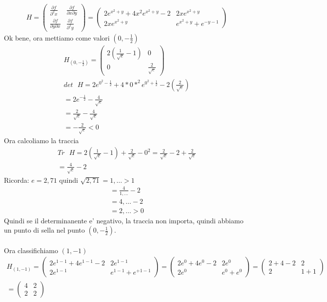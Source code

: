 \documentclass{article}
\begin{document}
\begin{align*}
    H=\begin{pmatrix}
        \frac{\partial f}{\partial^2 x} & \frac{\partial f}{\partial x \partial y} \\
        \frac{\partial f}{\partial y \partial x} & \frac{\partial f}{\partial^2 y}
    \end{pmatrix}
    = \begin{pmatrix}
        2e^{x^2+y}+4x^2e^{x^2+y}-2 & 2xe^{x^2+y} \\
        2xe^{x^2+y} & e^{x^2+y} + e^{-y-1}
    \end{pmatrix}
\end{align*}
Ok bene, ora mettiamo come valori $(0,-\frac{1}{2})$
\begin{align*}
    H_{(0,-\frac{1}{2})}=\begin{pmatrix}
        2(\frac{1}{\sqrt{e}}-1) & 0 \\
        0 & \frac{2}{\sqrt{e}}
    \end{pmatrix}\\
     \text{$det$ $H$}=2e^{0^2-\frac{1}{2}}+4*0*^2e^{0^2+\frac{1}{2}}-2(\frac{2}{\sqrt{e}}) \\
     = 2e^{-\frac{1}{2}}-\frac{4}{\sqrt{e}} \\
     = \frac{2}{\sqrt{e}}-\frac{4}{\sqrt{e}} \\
     = -\frac{2}{\sqrt{e}} < 0
\end{align*}
Ora calcoliamo la traccia
\begin{align*}
     \text{$Tr$ $H$}= 2(\frac{1}{\sqrt{e}}-1) + \frac{2}{\sqrt{e}} - 0^2=  \frac{2}{\sqrt{e}}-2+ \frac{2}{\sqrt{e}}\\     
     = \frac{4}{\sqrt{e}}-2
\end{align*}
Ricorda: $e=2,71$ quindi $\sqrt{2,71}=1,\dots > 1$ 
\begin{align*}
    = \frac{4}{1,\dots}-2 \\
    = 4,\dots -2 \\
    = 2,\dots >0
\end{align*}
Quindi se il determinanente e' negativo, la traccia non importa, quindi abbiamo un punto di sella nel punto $(0,-\frac{1}{2})$. \\ \\
Ora classifichiamo $(1,-1)$
\begin{align*}
    H_{(1,-1)}=\begin{pmatrix}
        2e^{1-1}+4e^{1-1}-2 & 2e^{1-1} \\
        2e^{1-1} & e^{1-1} + e^{+1-1}
    \end{pmatrix}
    = \begin{pmatrix}
            2e^{0}+4e^{0}-2 & 2e^{0} \\
            2e^{0} & e^{0} + e^{0}
        \end{pmatrix}
    = \begin{pmatrix}
        2+4-2 & 2 \\
        2 & 1 + 1
    \end{pmatrix} \\
    =\begin{pmatrix}
        4 & 2 \\
        2 & 2
    \end{pmatrix}
\end{align*}
\end{document}
